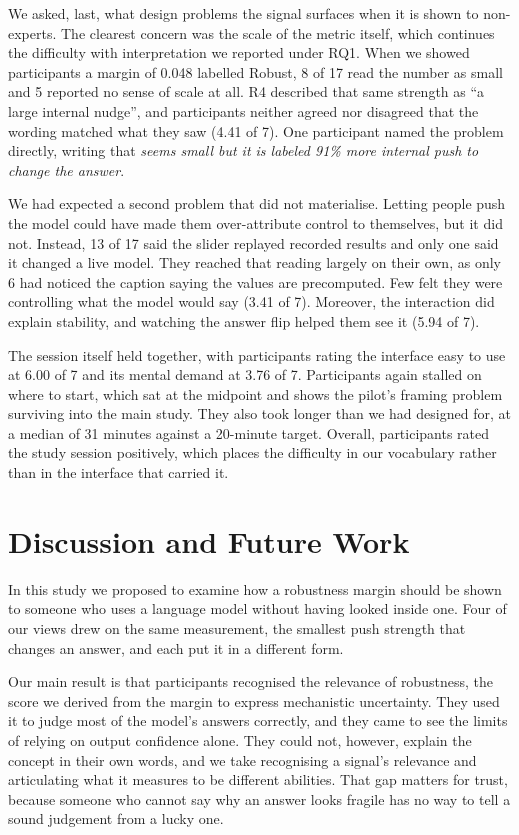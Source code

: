 \documentclass[sigconf]{acmart}
\newcommand{\pq}[1]{\emph{\guillemotleft #1\guillemotright}}
\begin{document}
We asked, last, what design problems the signal surfaces when it is shown to non-experts. The clearest concern
was the scale of the metric itself, which continues the difficulty with interpretation we reported under RQ1.
When we showed participants a margin of 0.048 labelled Robust, 8 of 17 read the number as small and 5 reported
no sense of scale at all. R4 described that same strength as ``a large internal nudge'', and participants
neither agreed nor disagreed that the wording matched what they saw (4.41 of 7). One participant named the
problem directly, writing that \pq{0.048 seems small but it is labeled 91\% more internal push to change the
answer}.

We had expected a second problem that did not materialise. Letting people push the model could have made them
over-attribute control to themselves, but it did not. Instead, 13 of 17 said the slider replayed recorded
results and only one said it changed a live model. They reached that reading largely on their own, as only 6 had
noticed the caption saying the values are precomputed. Few felt they were controlling what the model would say
(3.41 of 7). Moreover, the interaction did explain stability, and watching the answer flip helped them see it
(5.94 of 7).

The session itself held together, with participants rating the interface easy to use at 6.00 of 7 and its mental
demand at 3.76 of 7. Participants again stalled on where to start, which sat at the midpoint and shows the
pilot's framing problem surviving into the main study. They also took longer than we had designed for, at a
median of 31 minutes against a 20-minute target. Overall, participants rated the study session positively, which
places the difficulty in our vocabulary rather than in the interface that carried it.

\section{Discussion and Future Work}
\label{sec:discussion}

In this study we proposed to examine how a robustness margin should be shown to someone who uses a language
model without having looked inside one. Four of our views drew on the same measurement, the smallest push
strength that changes an answer, and each put it in a different form.

Our main result is that participants recognised the relevance of robustness, the score we derived from the
margin to express mechanistic uncertainty. They used it to judge most of the model's answers correctly, and they
came to see the limits of relying on output confidence alone. They could not, however, explain the concept in
their own words, and we take recognising a signal's relevance and articulating what it measures to be different
abilities. That gap matters for trust, because someone who cannot say why an answer looks fragile has no way to
tell a sound judgement from a lucky one.
\end{document}
